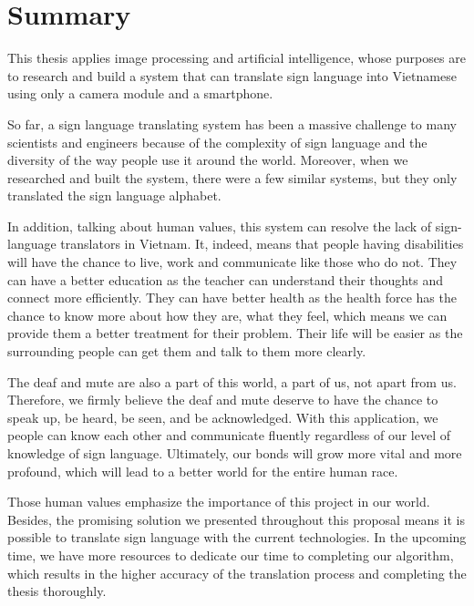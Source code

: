 \chapter{Summary}

This thesis applies image processing and artificial intelligence, whose purposes are to research and build a system that can translate sign language into Vietnamese using only a camera module and a smartphone.

So far, a sign language translating system has been a massive challenge to many scientists and engineers because of the complexity of sign language and the diversity of the way people use it around the world. Moreover, when we researched and built the system, there were a few similar systems, but they only translated the sign language alphabet.

In addition, talking about human values, this system can resolve the lack of sign-language translators in Vietnam. It, indeed, means that people having disabilities will have the chance to live, work and communicate like those who do not. They can have a better education as the teacher can understand their thoughts and connect more efficiently. They can have better health as the health force has the chance to know more about how they are, what they feel, which means we can provide them a better treatment for their problem. Their life will be easier as the surrounding people can get them and talk to them more clearly.

The deaf and mute are also a part of this world, a part of us, not apart from us. Therefore, we firmly believe the deaf and mute deserve to have the chance to speak up, be heard, be seen, and be acknowledged. With this application, we people can know each other and communicate fluently regardless of our level of knowledge of sign language. Ultimately, our bonds will grow more vital and more profound, which will lead to a better world for the entire human race.

Those human values emphasize the importance of this project in our world. Besides, the promising solution we presented throughout this proposal means it is possible to translate sign language with the current technologies. In the upcoming time, we have more resources to dedicate our time to completing our algorithm, which results in the higher accuracy of the translation process and completing the thesis thoroughly.
